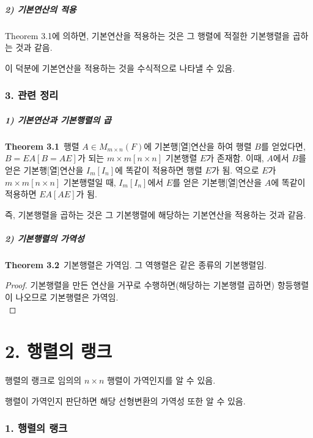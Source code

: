\subsubsection*{2) 기본연산의 적용}
Theorem 3.1에 의하면, 기본연산을 적용하는 것은 그 행렬에 적절한 기본행렬을 곱하는 것과 같음.

이 덕분에 기본연산을 적용하는 것을 수식적으로 나타낼 수 있음.


\section*{3. 관련 정리}
\subsubsection*{1) 기본연산과 기본행렬의 곱}
\textbf{Theorem 3.1}\, 행렬 $A \in M_{m \times n}(F)$에 기본행[열]연산을 하여 행렬 $B$를 얻었다면, $B=EA[B=AE]$가 되는 $m \times m[n \times n]$ 기본행렬 $E$가 존재함. 이때, $A$에서 $B$를 얻은 기본행[열]연산을 $I_m[I_n]$에 똑같이 적용하면 행렬 $E$가 됨. 역으로 $E$가 $m \times m[n \times n]$ 기본행렬일 때, $I_m[I_n]$에서 $E$를 얻은 기본행[열]연산을 $A$에 똑같이 적용하면 $EA[AE]$가 됨.

즉, 기본행렬을 곱하는 것은 그 기본행렬에 해당하는 기본연산을 적용하는 것과 같음.

\subsubsection*{2) 기본행렬의 가역성}
\textbf{Theorem 3.2}\, 기본행렬은 가역임. 그 역행렬은 같은 종류의 기본행렬임.

\begin{proof}
기본행렬을 만든 연산을 거꾸로 수행하면(해당하는 기본행렬 곱하면) 항등행렬이 나오므로 기본행렬은 가역임.\\
\end{proof}


\newpage


\part*{2. 행렬의 랭크}

행렬의 랭크로 임의의 $n \times n$ 행렬이 가역인지를 알 수 있음.

행렬이 가역인지 판단하면 해당 선형변환의 가역성 또한 알 수 있음.

\section*{1. 행렬의 랭크}
